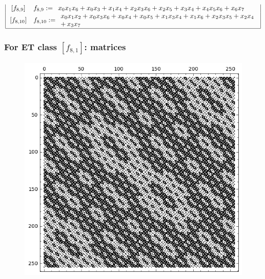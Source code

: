 \documentclass[pdf,sprung,slideColor,nocolorBG]{beamer}
\newenvironment{colortheme}[1]{
\def\ProvidesPackageRCS $##1${\relax}
\renewcommand{\ProcessOptions}{\relax}
\makeatletter

\makeatother
}{}
\begin{document}
\begin{colortheme}{jubata}
\begin{frame}
\begin{align*}
\begin{array}{|cl|}
\,[f_{ 8 , 9 }] & f_{ 8 , 9 } :=
\begin{array}{l}
x_{0} x_{1} x_{6} + x_{0} x_{3} + x_{1} x_{4} + x_{2} x_{3} x_{6} + x_{2} x_{5} + x_{3} x_{4} + x_{4} x_{5} x_{6} + x_{6} x_{7}
\end{array}
\\
\,[f_{ 8 , 10 }] & f_{ 8 , 10 } :=
\begin{array}{l}
x_{0} x_{1} x_{2} + x_{0} x_{3} x_{6} + x_{0} x_{4} + x_{0} x_{5} + x_{1} x_{3} x_{4} + x_{1} x_{6} + x_{2} x_{3} x_{5} + x_{2} x_{4}
\\
+\,  x_{3} x_{7}
\end{array}
\\
\hline
\end{array}
\end{align*}
\normalsize{}
\end{frame}
\begin{frame}
\frametitle{For ET class $[f_{8,1}]$: matrices}
\begin{figure}
\centering
\begin{minipage}{.48\textwidth}
  \centering
  \includegraphics[width=.9\linewidth]{../matrix_plot/re8_1_weight_class_matrix.png}
  \label{fig:8_1_weight_class_matrix}
\end{minipage}%
\begin{minipage}{.48\textwidth}
  \centering

\end{minipage}
\end{figure}
\end{frame}
\end{colortheme}
\end{document}
